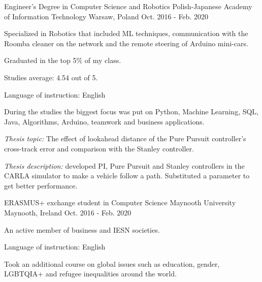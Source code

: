 

\begin{cventries}

  \cventry
    {Engineer's Degree in Computer Science and Robotics} %
    {Polish-Japanese Academy of Information Technology} %
    {Warsaw, Poland} %
    {Oct. 2016 - Feb. 2020} %
    {
      \begin{cvitems} %
       \item {Specialized in Robotics that included ML techniques, communication with the Roomba cleaner on the network and the remote steering of Arduino mini-cars.}
       \item {Graduated in the top 5\% of my class.}
       \item {Studies average: 4.54 out of 5.}
       \item {Language of instruction: English}
       \item {During the studies the biggest focus was put on Python, Machine Learning, SQL, Java, Algorithms, Arduino, teamwork and business applications.}
       \item {{\it Thesis topic:} The effect of lookahead distance of the Pure Pursuit controller’s cross-track error and comparison with the Stanley controller.}
       \item {{\it Thesis description:} developed PI, Pure Pursuit and Stanley controllers in the CARLA simulator to make a vehicle follow a path. Substituted a parameter to get better performance.}
      \end{cvitems}
    }
    
  \cventry
    {ERASMUS+ exchange student in Computer Science} %
    {Maynooth University} %
    {Maynooth, Ireland} %
    {Oct. 2016 - Feb. 2020} %
    {
      \begin{cvitems} %
       \item {An active member of business and IESN societies.}
       \item {Language of instruction: English}
       \item {Took an additional course on global issues such as education, gender, LGBTQIA+ and refugee inequalities around the world.}
      \end{cvitems}
    }

\end{cventries}
